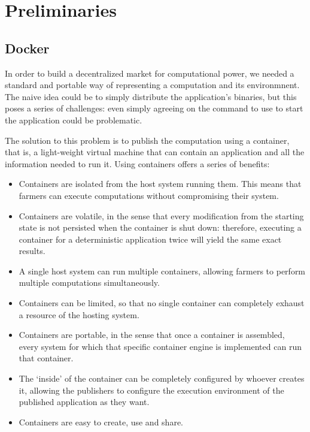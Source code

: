 
\section{Preliminaries}
\label{sect:preliminaries}

\subsection{Docker}
In order to build a decentralized market for computational power, we needed a standard and portable way of representing a computation and its environmnent. The naive idea could be to simply distribute the application's binaries, but this poses a series of challenges: even simply agreeing on the command to use to start the application could be problematic.

The solution to this problem is to publish the computation using a container, that is, a light-weight virtual machine that can contain an application and all the information needed to run it. Using containers offers a series of benefits:
\begin{itemize}
    \item Containers are isolated from the host system running them. This means that farmers can execute computations without compromising their system.
    \item Containers are volatile, in the sense that every modification from the starting state is not persisted when the container is shut down: therefore, executing a container for a deterministic application twice will yield the same exact results.
    \item A single host system can run multiple containers, allowing farmers to perform multiple computations simultaneously.
    \item Containers can be limited, so that no single container can completely exhaust a resource of the hosting system.
    \item Containers are portable, in the sense that once a container is assembled, every system for which that specific container engine is implemented can run that container.
    \item The `inside' of the container can be completely configured by whoever creates it, allowing the publishers to configure the execution environment of the published application as they want.
    \item Containers are easy to create, use and share.
\end{itemize}

